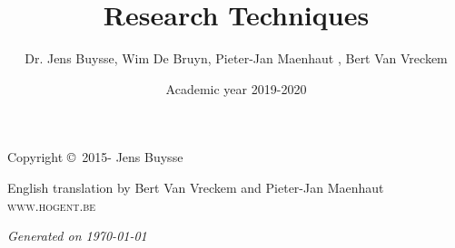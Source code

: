 \documentclass{hogent-report}
\title{Research Techniques}
\author{Dr. Jens Buysse, Wim {De Bruyn}, Pieter-Jan Maenhaut , Bert {Van Vreckem}}
\date{Academic year 2019-2020}
\begin{document}


\newpage

\thispagestyle{empty}

\vspace*{20cm}

\noindent Copyright \copyright\ 2015-{\the\year} Jens Buysse %

\noindent English translation by Bert Van Vreckem and Pieter-Jan Maenhaut\\

\noindent \textsc{www.hogent.be} %

\noindent \textit{Generated on \today} %



\usechapterimagefalse
\tableofcontents %

\cleardoublepage %

\def\R{\mathbb{R}}






    






%
%
%
%
%
%
%
%
%
\end{document}
